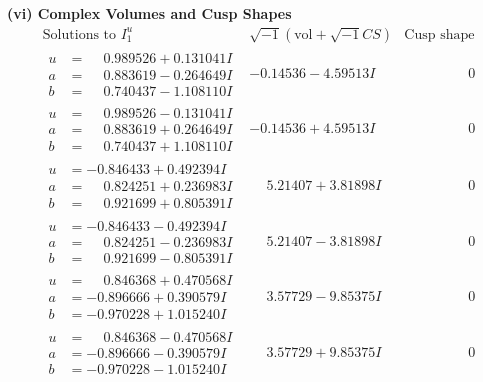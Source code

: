 \documentclass[1p]{elsarticle_modified}
\theoremstyle{definition}
\newcommand{\I}{\sqrt{-1}}
\begin{document}
\newpage\flushleft \textbf{(vi) Complex Volumes and Cusp Shapes}
$$\begin{array}{c|c|c}  
\text{Solutions to }I^u_{1}& \I (\text{vol} + \sqrt{-1}CS) & \text{Cusp shape}\\
 \hline 
\begin{aligned}
u &= \phantom{-}0.989526 + 0.131041 I \\
a &= \phantom{-}0.883619 - 0.264649 I \\
b &= \phantom{-}0.740437 - 1.108110 I\end{aligned}
 & -0.14536 - 4.59513 I & \phantom{-0.000000 } 0 \\ \hline\begin{aligned}
u &= \phantom{-}0.989526 - 0.131041 I \\
a &= \phantom{-}0.883619 + 0.264649 I \\
b &= \phantom{-}0.740437 + 1.108110 I\end{aligned}
 & -0.14536 + 4.59513 I & \phantom{-0.000000 } 0 \\ \hline\begin{aligned}
u &= -0.846433 + 0.492394 I \\
a &= \phantom{-}0.824251 + 0.236983 I \\
b &= \phantom{-}0.921699 + 0.805391 I\end{aligned}
 & \phantom{-}5.21407 + 3.81898 I & \phantom{-0.000000 } 0 \\ \hline\begin{aligned}
u &= -0.846433 - 0.492394 I \\
a &= \phantom{-}0.824251 - 0.236983 I \\
b &= \phantom{-}0.921699 - 0.805391 I\end{aligned}
 & \phantom{-}5.21407 - 3.81898 I & \phantom{-0.000000 } 0 \\ \hline\begin{aligned}
u &= \phantom{-}0.846368 + 0.470568 I \\
a &= -0.896666 + 0.390579 I \\
b &= -0.970228 + 1.015240 I\end{aligned}
 & \phantom{-}3.57729 - 9.85375 I & \phantom{-0.000000 } 0 \\ \hline\begin{aligned}
u &= \phantom{-}0.846368 - 0.470568 I \\
a &= -0.896666 - 0.390579 I \\
b &= -0.970228 - 1.015240 I\end{aligned}
 & \phantom{-}3.57729 + 9.85375 I & \phantom{-0.000000 } 0 \\ \hline\begin{aligned}

\end{aligned}
\end{array}$$
\end{document}
